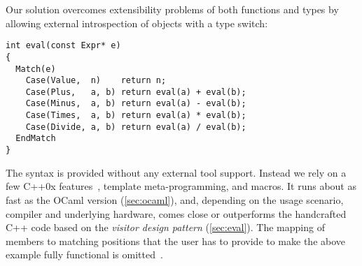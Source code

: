 Our solution overcomes extensibility problems of both functions and 
types by allowing external introspection of objects with a type switch:

\begin{lstlisting}[keepspaces,columns=flexible]
int eval(const Expr* e)
{
  Match(e)
    Case(Value,  n)    return n;
    Case(Plus,   a, b) return eval(a) + eval(b);
    Case(Minus,  a, b) return eval(a) - eval(b);
    Case(Times,  a, b) return eval(a) * eval(b);
    Case(Divide, a, b) return eval(a) / eval(b);
  EndMatch
}
\end{lstlisting}

\noindent
The syntax is provided without any external tool support. Instead we rely on a 
few C++0x features~\cite{C++0x}, template meta-programming, and macros. It runs 
about as fast as the OCaml version (\textsection\ref{sec:ocaml}), and, depending 
on the usage scenario, compiler and underlying hardware, comes close or 
outperforms the handcrafted C++ code based on the \emph{visitor design pattern} 
(\textsection\ref{sec:eval}). The mapping of members to matching positions that 
the user has to provide to make the above example fully functional is 
omitted~\cite{TR}.



